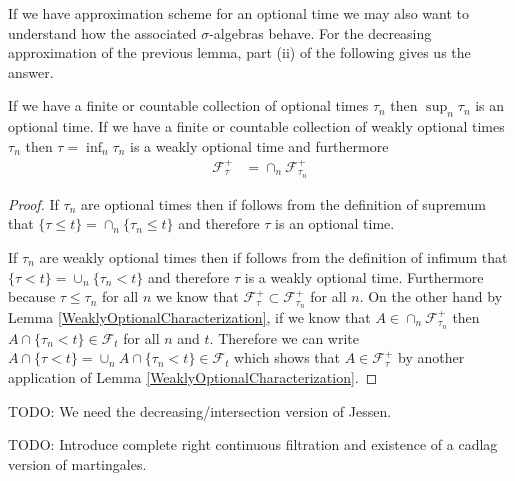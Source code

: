 If we have approximation scheme for an optional time we may also want
to understand how the associated $\sigma$-algebras behave.  For the
decreasing approximation of the previous lemma, part (ii) of the
following gives us the answer.
\begin{lem}If we have a finite or countable collection of optional
  times $\tau_n$ then $\sup_n \tau_n$ is an optional time.  If we have
  a finite or countable collection of weakly optional times $\tau_n$
  then $\tau = \inf_n \tau_n$ is a weakly optional time and
  furthermore
\begin{align*}
\mathcal{F}^+_\tau &= \cap_n \mathcal{F}^+_{\tau_n}
\end{align*}
\end{lem}
\begin{proof}
If $\tau_n$ are optional times then if follows from the definition of
supremum that $\lbrace \tau \leq t \rbrace = \cap_n \lbrace \tau_n
\leq t \rbrace$ and therefore $\tau$ is an optional time.

If $\tau_n$ are weakly optional times then if follows from the definition of
infimum that $\lbrace \tau < t \rbrace = \cup_n \lbrace \tau_n
< t \rbrace$ and therefore $\tau$ is a weakly optional time.
Furthermore because $\tau \leq \tau_n$ for all $n$ we know that
$\mathcal{F}^+_\tau \subset \mathcal{F}^+_{\tau_n}$ for all $n$.  On
the other hand by Lemma \ref{WeaklyOptionalCharacterization}, if we know that $A \in \cap_n \mathcal{F}^+_{\tau_n}$
then $A \cap \lbrace \tau_n < t \rbrace \in \mathcal{F}_t$ for all $n$
and $t$.  Therefore we can write $A \cap \lbrace \tau < t \rbrace =  \cup_n A \cap \lbrace \tau_n
< t \rbrace \in \mathcal{F}_t$ which shows that $A \in
\mathcal{F}^+_\tau$ by another application of Lemma \ref{WeaklyOptionalCharacterization}.
\end{proof}

TODO: We need the decreasing/intersection version of Jessen.

TODO: Introduce complete right continuous filtration and existence of
a cadlag version of martingales.

